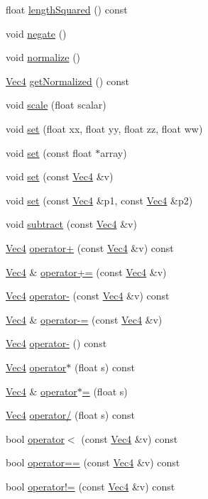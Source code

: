 \begin{DoxyCompactItemize}
float \hyperlink{classVec4_a06243f2009024c79f544c99acf621e53}{length\+Squared} () const
\item 
void \hyperlink{classVec4_a3d83bd288450da743e021507acc41f48}{negate} ()
\item 
void \hyperlink{classVec4_aecf9d5a3003c2a443098b4d80bc9dea6}{normalize} ()
\item 
\hyperlink{classVec4}{Vec4} \hyperlink{classVec4_aa5a3512165c25bf7d5d64293db3fbd64}{get\+Normalized} () const
\item 
void \hyperlink{classVec4_af97ed4fd28d88565faef29814467e057}{scale} (float scalar)
\item 
void \hyperlink{classVec4_a65e2bb85e21dc0a4aca4a6f6348b0d48}{set} (float xx, float yy, float zz, float ww)
\item 
void \hyperlink{classVec4_aa3e7f9a7fbb88c0407fc1ec79e2691db}{set} (const float $\ast$array)
\item 
void \hyperlink{classVec4_ab247286076dd5b9d7d88e8b5a73d636a}{set} (const \hyperlink{classVec4}{Vec4} \&v)
\item 
void \hyperlink{classVec4_aaaaf92933c49b13b060f2bdf063fa430}{set} (const \hyperlink{classVec4}{Vec4} \&p1, const \hyperlink{classVec4}{Vec4} \&p2)
\item 
void \hyperlink{classVec4_a8a43b0370837df064167d3dcca9c8952}{subtract} (const \hyperlink{classVec4}{Vec4} \&v)
\item 
\hyperlink{classVec4}{Vec4} \hyperlink{classVec4_a8855350c075fbe08afdb8033fcd61643}{operator+} (const \hyperlink{classVec4}{Vec4} \&v) const
\item 
\hyperlink{classVec4}{Vec4} \& \hyperlink{classVec4_adcf05f3b2dddca53b2fe4d1825e1a263}{operator+=} (const \hyperlink{classVec4}{Vec4} \&v)
\item 
\hyperlink{classVec4}{Vec4} \hyperlink{classVec4_a54d8d01faa652f7c3b7204644a01a0d3}{operator-\/} (const \hyperlink{classVec4}{Vec4} \&v) const
\item 
\hyperlink{classVec4}{Vec4} \& \hyperlink{classVec4_a2644a968dd429cece5ed615aa3615db6}{operator-\/=} (const \hyperlink{classVec4}{Vec4} \&v)
\item 
\hyperlink{classVec4}{Vec4} \hyperlink{classVec4_a1638cef5793ee08b5a62bcb8dd06c17c}{operator-\/} () const
\item 
\hyperlink{classVec4}{Vec4} \hyperlink{classVec4_ad6bcce9a25272c63a5ad3b8cf658c732}{operator$\ast$} (float s) const
\item 
\hyperlink{classVec4}{Vec4} \& \hyperlink{classVec4_a4b1c5f268c536f95acf47f4467d61373}{operator$\ast$=} (float s)
\item 
\hyperlink{classVec4}{Vec4} \hyperlink{classVec4_a01bf1811f01aaf89eb1b653188ea1a08}{operator/} (float s) const
\item 
bool \hyperlink{classVec4_ac7ecf33888559cc10db167b2b64282e2}{operator$<$} (const \hyperlink{classVec4}{Vec4} \&v) const
\item 
bool \hyperlink{classVec4_aee56eb96539827efc62ff4d9fde66c67}{operator==} (const \hyperlink{classVec4}{Vec4} \&v) const
\item 
bool \hyperlink{classVec4_a3b6232cb8bef92bc2137590dace24c61}{operator!=} (const \hyperlink{classVec4}{Vec4} \&v) const
\end{DoxyCompactItemize}
